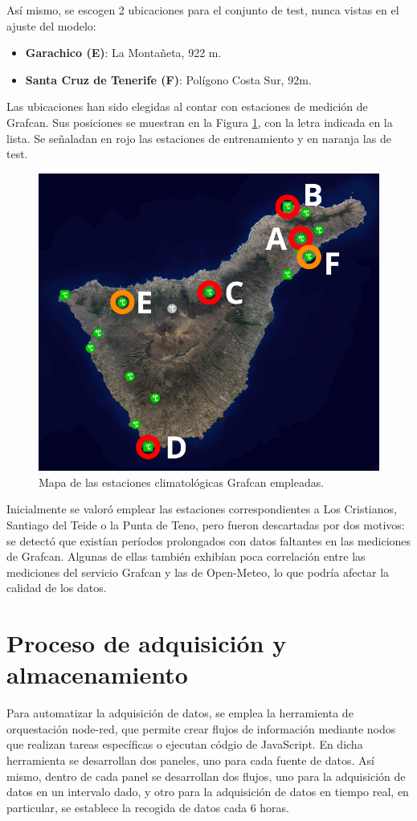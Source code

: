 Así mismo, se escogen 2 ubicaciones para el conjunto de test, nunca vistas en el ajuste del modelo:
\begin{itemize}
    \item \textbf{Garachico (E)}: La Montañeta, 922 m.
    \item \textbf{Santa Cruz de Tenerife (F)}: Polígono Costa Sur, 92m.
\end{itemize}

Las ubicaciones han sido elegidas al contar con estaciones de medición de Grafcan.
Sus posiciones se muestran en la Figura \ref{mapa_estaciones}, con la letra indicada en la lista.
Se señaladan en rojo las estaciones de entrenamiento y en naranja las de test.

\begin{figure}[htb]
   \centering
   \includegraphics[width=0.6\linewidth]{images/mapa_estaciones}
   \caption{Mapa de las estaciones climatológicas Grafcan empleadas.}
   \label{mapa_estaciones}
\end{figure}

Inicialmente se valoró emplear las estaciones correspondientes a Los Cristianos, Santiago del Teide o la Punta de Teno, pero fueron descartadas por dos motivos: 
se detectó que existían períodos prolongados con datos faltantes en las mediciones de Grafcan. Algunas de ellas también exhibían poca correlación entre las mediciones
del servicio Grafcan y las de Open-Meteo, lo que podría afectar la calidad de los datos.

\bigskip

\section{Proceso de adquisición y almacenamiento}

Para automatizar la adquisición de datos, se emplea la herramienta de orquestación node-red, que permite crear flujos de información mediante nodos que realizan tareas específicas o ejecutan códgio de JavaScript.
En dicha herramienta se desarrollan dos paneles, uno para cada fuente de datos. 
Así mismo, dentro de cada panel se desarrollan dos flujos, uno para la adquisición de datos en un intervalo dado, y otro para la adquisición de datos en tiempo real, en particular, 
se establece la recogida de datos cada 6 horas.

